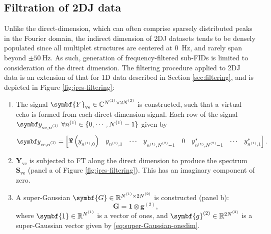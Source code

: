 \subsection{Filtration of \ac{2DJ} data}
\label{subsec:jres-filtering}
Unlike the direct-dimension, which can often comprise sparsely distributed
peaks in the Fourier domain, the indirect dimension of \ac{2DJ} datasets tends
to be densely populated since all multiplet structures are centered at
\qty{0}{\hertz}, and rarely span beyond $\pm \qty{50}{\hertz}$. As such,
generation of frequency-filtered sub-\acp{FID} is limited to consideration of
the direct dimension.
The filtering procedure applied to \ac{2DJ} data is an extension of that
for \ac{1D} data described in Section \ref{sec:filtering}, and is
depicted in Figure \ref{fig:jres-filtering}:
\begin{enumerate}
    \item The signal $\symbf{Y}_{\text{ve}} \in \mathbb{C}^{\None \times 2 \Ntwo}$ is
    constructed, such that a virtual echo is formed from each direct-dimension
    signal. Each row of the signal $\by_{\text{ve},\none}\ \forall n^{(1)} \in
    \lbrace 0, \cdots, N^{(1)} - 1 \rbrace$ given by
    \begin{equation}
        \by_{\text{ve},\none} =
            \begin{bmatrix}
                \Re\left(y_{n^{(1)}, 0}^{\vphantom{*}}\right) &
                y_{n^{(1)}, 1}^{\vphantom{*}} &
                \cdots &
                y_{n^{(1)}, \Ntwo - 1}^{\vphantom{*}} &
                0 &
                y_{n^{(1)}, \Ntwo - 1}^* &
                \cdots &
                y_{n^{(1)}, 1}^*
            \end{bmatrix}.
    \end{equation}
    \item $\symbf{Y}_{\text{ve}}$ is subjected to \ac{FT} along the direct
        dimension to produce the spectrum  $\symbf{S}_{\text{ve}}$ (panel a of
        Figure \ref{fig:jres-filtering}). This has an imaginary component of
        zero.
    \item A super-Gaussian $\symbf{G} \in \mathbb{R}^{\None \times 2 \Ntwo}$ is
        constructed (panel b):
        \begin{equation}
            \symbf{G} = \symbf{1} \otimes \symbf{g}^{(2)},
        \end{equation}
        where $\symbf{1} \in \mathbb{R}^{\None}$ is a vector of ones, and
        $\symbf{g}^{(2)} \in \mathbb{R}^{2\Ntwo}$ is a super-Gaussian vector
        given by \eqref{eq:super-Gaussian-onedim}.

\end{enumerate}
